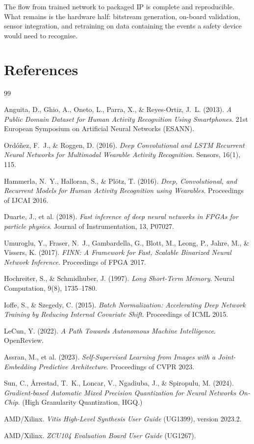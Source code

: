 \documentclass[11pt,a4paper]{article}
\begin{document}
The flow from trained network to packaged IP is complete and reproducible. What
remains is the hardware half: bitstream generation, on-board validation, sensor
integration, and retraining on data containing the events a safety device would
need to recognise.

\section{References}

\begin{thebibliography}{99}

Anguita, D., Ghio, A., Oneto, L., Parra, X., \& Reyes-Ortiz, J.~L. (2013).
\textit{A Public Domain Dataset for Human Activity Recognition Using
Smartphones}. 21st European Symposium on Artificial Neural Networks (ESANN).

Ordóñez, F.~J., \& Roggen, D. (2016). \textit{Deep Convolutional and LSTM
Recurrent Neural Networks for Multimodal Wearable Activity Recognition}.
Sensors, 16(1), 115.

Hammerla, N.~Y., Halloran, S., \& Plötz, T. (2016). \textit{Deep,
Convolutional, and Recurrent Models for Human Activity Recognition using
Wearables}. Proceedings of IJCAI 2016.

Duarte, J., et al. (2018). \textit{Fast inference of deep neural networks in
FPGAs for particle physics}. Journal of Instrumentation, 13, P07027.

Umuroglu, Y., Fraser, N.~J., Gambardella, G., Blott, M., Leong, P., Jahre, M.,
\& Vissers, K. (2017). \textit{FINN: A Framework for Fast, Scalable Binarized
Neural Network Inference}. Proceedings of FPGA 2017.

Hochreiter, S., \& Schmidhuber, J. (1997). \textit{Long Short-Term Memory}.
Neural Computation, 9(8), 1735--1780.

Ioffe, S., \& Szegedy, C. (2015). \textit{Batch Normalization: Accelerating
Deep Network Training by Reducing Internal Covariate Shift}. Proceedings of
ICML 2015.

LeCun, Y. (2022). \textit{A Path Towards Autonomous Machine Intelligence}.
OpenReview.

Assran, M., et al. (2023). \textit{Self-Supervised Learning from Images with a
Joint-Embedding Predictive Architecture}. Proceedings of CVPR 2023.

Sun, C., \AA{}rrestad, T.~K., Loncar, V., Ngadiuba, J., \& Spiropulu, M.
(2024). \textit{Gradient-based Automatic Mixed Precision Quantization for
Neural Networks On-Chip}. (High Granularity Quantization, HGQ.)

AMD/Xilinx. \textit{Vitis High-Level Synthesis User Guide} (UG1399),
version 2023.2.

AMD/Xilinx. \textit{ZCU104 Evaluation Board User Guide} (UG1267).

\end{thebibliography}
\end{document}
